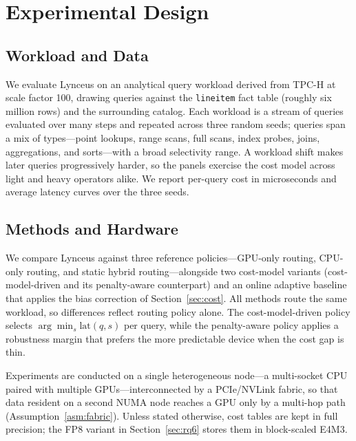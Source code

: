 \documentclass{article}
\begin{document}
\section{Experimental Design}
\label{sec:experimental_design}

\subsection{Workload and Data}
\label{sec:setup}

We evaluate Lynceus on an analytical query workload derived from TPC-H at scale
factor 100, drawing queries against the \texttt{lineitem} fact table (roughly six
million rows) and the surrounding catalog. Each workload is a stream of queries
evaluated over many steps and repeated across three random seeds; queries span a
mix of types---point lookups, range scans, full scans, index probes, joins,
aggregations, and sorts---with a broad selectivity range. A workload shift makes
later queries progressively harder, so the panels exercise the cost model across
light and heavy operators alike. We report per-query cost in microseconds and
average latency curves over the three seeds.

\subsection{Methods and Hardware}
\label{sec:methods}

We compare Lynceus against three reference policies---GPU-only routing, CPU-only
routing, and static hybrid routing---alongside two cost-model variants
(cost-model-driven and its penalty-aware counterpart) and an online adaptive
baseline that applies the bias correction of Section~\ref{sec:cost}. All methods
route the same workload, so differences reflect routing policy alone. The
cost-model-driven policy selects $\arg\min_s \mathrm{lat}(q,s)$ per query, while
the penalty-aware policy applies a robustness margin that prefers the more
predictable device when the cost gap is thin.

Experiments are conducted on a single heterogeneous node---a multi-socket CPU
paired with multiple GPUs---interconnected by a PCIe/NVLink fabric, so that data
resident on a second NUMA node reaches a GPU only by a multi-hop path
(Assumption~\ref{asm:fabric}). Unless stated otherwise, cost tables are kept in
full precision; the FP8 variant in Section~\ref{sec:rq6} stores them in
block-scaled E4M3.
\end{document}
